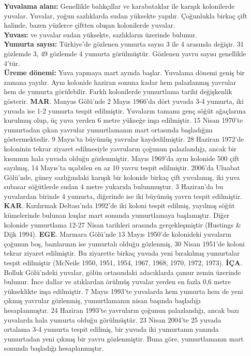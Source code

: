 \documentclass[
  letterpaper,
  DIV=11,
  numbers=noendperiod]{scrreprt}
\begin{document}
\textbf{Yuvalama alanı:} Genellikle balıkçıllar ve karabataklar ile
karışık kolonilerde yuvalar. Yuvalar, yoğun sazlıklarda sudan yüksekte
yapılır. Çoğunlukla birkaç çift halinde, bazen yüzlerce çiftten oluşan
kolonilerde yuvalar.\\
\textbf{Yuvası:} ve yuvalar sudan yüksekte, sazlıkların üzerinde
bulunur.\\
\textbf{Yumurta sayısı:} Türkiye'de gözlenen yumurta sayısı 3 ile 4
arasında değişir. 31 gözlemde 3, 49 gözlemde 4 yumurta görülmüştür.
Gözlenen yavru sayısı genellikle 4'tür.\\
\textbf{Üreme dönemi:} Yuva yapmaya mart ayında başlar. Yuvalama dönemi
geniş bir zamana yayılır. Aynı kolonide haziran sonuna kadar hem
palazlanmış yavrular hem de yumurta görülebilir. Farklı kolonilerde
yumurtlama tarihi değişkenlik gösterir. \textbf{MAR}. Manyas Gölü'nde 2
Mayıs 1966'da dört yuvada 3-4 yumurta, iki yuvada ise 1-2 yumurta tespit
edilmiştir. Yuvaların tamamı genç söğüt ağaçlarına kurulmuş olup, üç
yuva yerden 6 metre yükseğe inşa edilmiştir. 15 Nisan 1970'te yumurtadan
çıkan yavrular yumurtlamanın mart ortasında başladığını göstermektedir.
9 Mayıs'ta büyümüş yavrular kaydedilmiştir. 28 Haziran 1972'de koloninin
tekrar ziyaret edilmesiyle yavruların çoğunun palazlandığı, ancak bir
kısmının hala yuvada olduğu gözlenmiştir. Mayıs 1969'da aynı kolonide
500 çift sayılmış, 14 Mayıs'ta uçabilen en az 10 yavru tespit
edilmiştir. 2006'da Uluabat Gölü'nde, güney sazlığındaki karışık bir
kolonide birkaç çift yuvalamış, iki yuva subasar söğütlerde sudan 4
metre yukarıda bulunmuştur. 3 Haziran'da bu yuvalardan birinde 4
yumurta, diğerinde ise iki büyümüş yavru tespit edilmiştir.
\textbf{KAR}. Kızılırmak Deltası'nda 1992'de iki koloni tespit edilmiş,
yayılmış söğüt kümelerinde bulunan kuşlar mart sonunda yumurtlamaya
başlamıştır. Diğer kolonide yumurtlama 12-27 Nisan tarihleri arasında
gerçekleşmiştir (Hustings \& Dijk 1994). \textbf{EGE}. Marmara Gölü'nde
13 Mayıs 1950'de kolonideki yuvaların çoğunun boş, bazılarının ise
yumurtalı olduğu gözlenmiş, 30 Nisan 1951'de koloni tekrar ziyaret
edilmiştir. Bu ziyarette birkaç yuvada yeni bırakılmış yumurtalar tespit
edilmiştir (McNeile 1950, 1951, 1954, 1967, 1968, 1970, 1972, 1973).
\textbf{İÇA}. Bolluk Gölü'ndeki yuvalar, gölün ortasındaki adacıklarda
çamur zemin üzerinde bulunur. İnce dallar ve atıklardan örülmüş yuvalar
yerden en fazla 0,6 metre yükseklikte inşa edilmiştir. 7 Mayıs 1993'te
yuvalarda hem yumurta hem de yeni çıkmış yavrular gözlenmiş,
yumurtlamanın nisan başında başladığı hesaplanmıştır. 24 Haziran 1993'te
yavruların çoğunun palazlandığı, ancak bazı yuvalarda hala yumurta
olduğu görülmüştür. 23 Nisan 2004'te 25 yuvada ortalama 3-4 yumurta
tespit edilmiş, bir yuvada iki yumurtanın yanında yumurtadan yeni çıkmış
bir yavru gözlenmiştir. Buna göre, yumurtlamanın mart sonunda başladığı
hesaplanmıştır.
\end{document}
